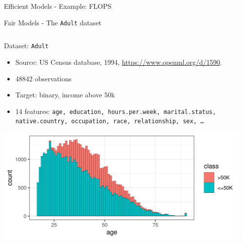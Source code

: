 \begin{frame}{Efficient Models - Example: FLOPS}
\end{frame}

\begin{frame}{Fair Models - The \texttt{Adult} dataset}
\begin{columns}
\begin{column}{0.4\textwidth}
Dataset: \texttt{Adult}
\begin{itemize}
  \footnotesize
  \item  Source: US Census database, 1994, \url{https://www.openml.org/d/1590}.
  \item 48842 observations
  \item Target: binary, income above 50k
  \item 14 features: \texttt{age, education, hours.per.week, marital.status, native.country, occupation, race, relationship, sex, \ldots}
\end{itemize}
\includegraphics[scale = 0.45]{images/dataset_adult_age_sex.png}
\end{column}%
\begin{column}{0.6\textwidth}


\end{column}
\end{columns}
\end{frame}

